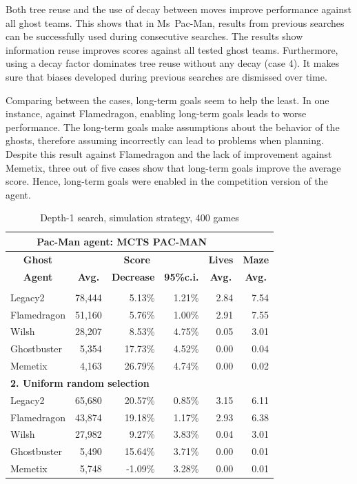 \documentclass[journal]{IEEEtran}
\begin{document}
Both tree reuse and the use of decay between moves improve performance against all ghost teams. This shows that in Ms~Pac-Man, results from previous searches can be successfully used during consecutive searches. The results show information reuse improves scores against all tested ghost teams. Furthermore, using a decay factor dominates tree reuse without any decay (case 4). It makes sure that biases developed during previous searches are dismissed over time.

Comparing between the cases, long-term goals seem to help the least. In one instance, against {\sc Flamedragon}, enabling long-term goals leads to worse performance. The long-term goals make assumptions about the behavior of the ghosts, therefore assuming incorrectly can lead to problems when planning. Despite this result against {\sc Flamedragon} and the lack of improvement against {\sc Memetix}, three out of five cases show that long-term goals improve the average score. Hence, long-term goals were enabled in the competition version of the agent. 

\begin{table}[htbp]
  \centering
  \caption{Depth-1 search, simulation strategy, 400 games}
    \begin{tabular}{lrrrrr}
    \toprule
    \multicolumn{5}{c}{\textbf{Pac-Man agent: MCTS PAC-MAN}} \\
    \midrule
\multicolumn{1}{c}{\textbf{Ghost}} & \multicolumn{3}{c}{\textbf{Score}} & \multicolumn{1}{c}{\textbf{Lives}} & \multicolumn{1}{c}{\textbf{Maze}} \\
    \multicolumn{1}{c}{\textbf{Agent}} & \multicolumn{1}{c}{\textbf{Avg.}} & \multicolumn{1}{c}{\textbf{Decrease}} & \multicolumn{1}{c}{\textbf{95\%c.i.}} & \multicolumn{1}{c}{\textbf{Avg.}} & \multicolumn{1}{c}{\textbf{Avg.}} \\ \noalign{\smallskip}
    \multicolumn{6}{l}{\textbf{1. UCT selection}} \\
    {\sc Legacy2 } & 78,444 & 5.13\% & 1.21\% & 2.84  & 7.54 \\
    {\sc Flamedragon } & 51,160 & 5.76\% & 1.00\% & 2.91  & 7.55 \\
    {\sc Wilsh } & 28,207 & 8.53\% & 4.75\% & 0.05  & 3.01 \\
    {\sc Ghostbuster } & 5,354 & 17.73\% & 4.52\% & 0.00  & 0.04 \\
    {\sc Memetix } & 4,163 & 26.79\% & 4.74\% & 0.00  & 0.02 \\
    \multicolumn{6}{l}{\textbf{2. Uniform random selection}} \\
    {\sc Legacy2 } & 65,680 & 20.57\% & 0.85\% & 3.15  & 6.11 \\
    {\sc Flamedragon } & 43,874 & 19.18\% & 1.17\% & 2.93  & 6.38 \\
    {\sc Wilsh } & 27,982 & 9.27\% & 3.83\% & 0.04  & 3.01 \\
    {\sc Ghostbuster } & 5,490 & 15.64\% & 3.71\% & 0.00  & 0.01 \\
    {\sc Memetix } & 5,748 & -1.09\% & 3.28\% & 0.00  & 0.01 \\
    \bottomrule
    \end{tabular}%
  \label{tab:single_ply}%
\end{table}%
\end{document}
